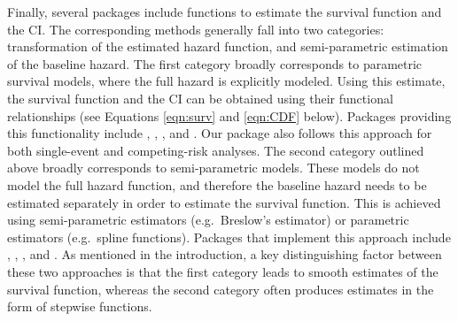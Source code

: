 Finally, several packages include functions to estimate the survival
function and the CI. The corresponding methods generally fall into two
categories: transformation of the estimated hazard function, and
semi-parametric estimation of the baseline hazard. The first category
broadly corresponds to parametric survival models, where the full hazard
is explicitly modeled. Using this estimate, the survival function and
the CI can be obtained using their functional relationships (see
Equations \ref{eqn:surv} and \ref{eqn:CDF} below). Packages providing
this functionality include , , , and
. Our package  also follows this approach
for both single-event and competing-risk analyses. The second category
outlined above broadly corresponds to semi-parametric models. These
models do not model the full hazard function, and therefore the baseline
hazard needs to be estimated separately in order to estimate the
survival function. This is achieved using semi-parametric estimators
(e.g.~Breslow's estimator) or parametric estimators (e.g.~spline
functions). Packages that implement this approach include
, , , and . As
mentioned in the introduction, a key distinguishing factor between these
two approaches is that the first category leads to smooth estimates of
the survival function, whereas the second category often produces
estimates in the form of stepwise functions.

